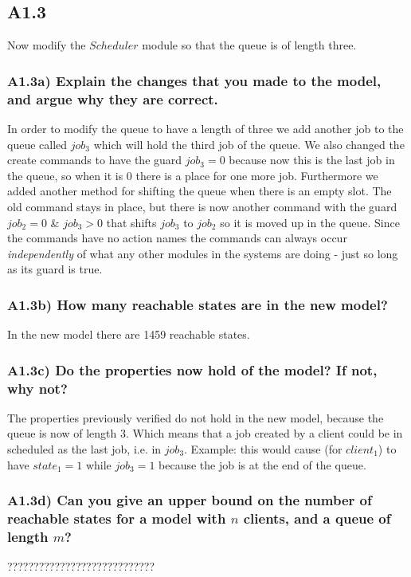 \documentclass[12pt]{report}
\begin{document}
\subsection*{A1.3}
Now modify the $Scheduler$ module so that the queue is of length three.

\subsubsection*{A1.3a) Explain the changes that you made to the model, and argue why they are correct.}
In order to modify the queue to have a length of three we add another job to the queue called $job_3$ which will hold the third job of the queue. We also changed the create commands to have the guard $job_3 = 0$ because now this is the last job in the queue, so when it is 0 there is a place for one more job. Furthermore we added another method for shifting the queue when there is an empty slot. The old command stays in place, but there is now another command with the guard $job_2=0$ \& $job_3>0$ that shifts $job_3$ to $job_2$ so it is moved up in the queue. Since the commands have no action names the commands can always occur \emph{independently} of what any other modules in the systems are doing - just so long as its guard is true.

\subsubsection*{A1.3b) How many reachable states are in the new model?}
In the new model there are 1459 reachable states.

\subsubsection*{A1.3c) Do the properties now hold of the model? If not, why not?}
The properties previously verified do not hold in the new model, because the queue is now of length 3. Which means that a job created by a client could be in scheduled as the last job, i.e. in $job_3$. Example: this would cause (for $client_1$) to have $state_1 = 1$ while $job_3=1$ because the job is at the end of the queue.

\subsubsection*{A1.3d) Can you give an upper bound on the number of reachable states for a model with $n$ clients, and a queue of length $m$?}
????????????????????????????
\end{document}
